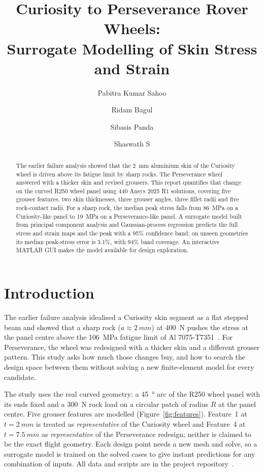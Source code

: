 \documentclass[11pt,a4paper]{article}
\title{Curiosity to Perseverance Rover Wheels:\\ Surrogate Modelling of Skin Stress and Strain}
\author{Pabitra Kumar Sahoo \and Ridam Bagul \and Sibasis Panda \and Shaswath S}
\date{}
\begin{document}
\maketitle

\begin{abstract}
\noindent The earlier failure analysis showed that the \SI{2}{mm} aluminium skin of the Curiosity wheel is driven above its fatigue limit by sharp rocks. The Perseverance wheel answered with a thicker skin and revised grousers. This report quantifies that change on the curved R250 wheel panel using 440 Ansys 2025 R1 solutions, covering five grouser features, two skin thicknesses, three grouser angles, three fillet radii and five rock-contact radii. For a sharp rock, the median peak stress falls from \SI{86}{MPa} on a Curiosity-like panel to \SI{19}{MPa} on a Perseverance-like panel. A surrogate model built from principal component analysis and Gaussian-process regression predicts the full stress and strain maps and the peak with a 95\% confidence band; on unseen geometries its median peak-stress error is 3.1\%, with 94\% band coverage. An interactive MATLAB GUI makes the model available for design exploration.
\end{abstract}

\section{Introduction}

The earlier failure analysis idealised a Curiosity skin segment as a flat stepped beam and showed that a sharp rock ($a \approx \SI{2}{mm}$) at \SI{400}{N} pushes the stress at the panel centre above the \SI{106}{MPa} fatigue limit of Al 7075-T7351~\cite{nasa}. For Perseverance, the wheel was redesigned with a thicker skin and a different grouser pattern. This study asks how much those changes buy, and how to search the design space between them without solving a new finite-element model for every candidate.

The study uses the real curved geometry: a \SI{45}{\degree} arc of the R250 wheel panel with its ends fixed and a \SI{300}{N} rock load on a circular patch of radius $R$ at the panel centre. Five grouser features are modelled (Figure~\ref{fig:features}). Feature~1 at $t = \SI{2}{mm}$ is treated as \emph{representative} of the Curiosity wheel and Feature~4 at $t = \SI{7.5}{mm}$ as \emph{representative} of the Perseverance redesign; neither is claimed to be the exact flight geometry. Each design point needs a new mesh and solve, so a surrogate model is trained on the solved cases to give instant predictions for any combination of inputs. All data and scripts are in the project repository~\cite{repo}.
\end{document}
